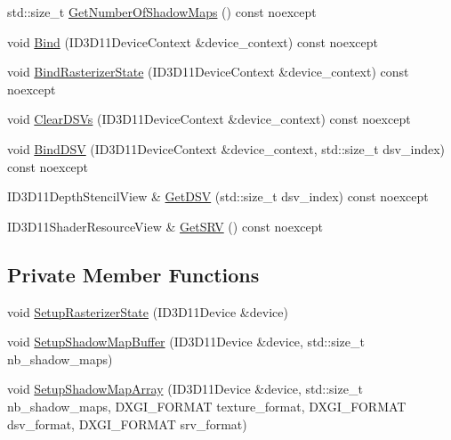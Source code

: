 \begin{DoxyCompactItemize}
\item 
std\+::size\+\_\+t \mbox{\hyperlink{classmage_1_1rendering_1_1_shadow_map_buffer_a7cdd2f44cbd75c40062da981771a91a6}{Get\+Number\+Of\+Shadow\+Maps}} () const noexcept
\item 
void \mbox{\hyperlink{classmage_1_1rendering_1_1_shadow_map_buffer_a59fccb2b8261a60c955f81e16d530cda}{Bind}} (I\+D3\+D11\+Device\+Context \&device\+\_\+context) const noexcept
\item 
void \mbox{\hyperlink{classmage_1_1rendering_1_1_shadow_map_buffer_a5216f8d02a3e92a8dcd34dcc6889563c}{Bind\+Rasterizer\+State}} (I\+D3\+D11\+Device\+Context \&device\+\_\+context) const noexcept
\item 
void \mbox{\hyperlink{classmage_1_1rendering_1_1_shadow_map_buffer_a1af9b2bbeaefb1367dbf6c66a2191bcc}{Clear\+D\+S\+Vs}} (I\+D3\+D11\+Device\+Context \&device\+\_\+context) const noexcept
\item 
void \mbox{\hyperlink{classmage_1_1rendering_1_1_shadow_map_buffer_ac0e077d4bfb672f1da69a7e2d8e62e04}{Bind\+D\+SV}} (I\+D3\+D11\+Device\+Context \&device\+\_\+context, std\+::size\+\_\+t dsv\+\_\+index) const noexcept
\item 
I\+D3\+D11\+Depth\+Stencil\+View \& \mbox{\hyperlink{classmage_1_1rendering_1_1_shadow_map_buffer_ac4904597828c7ffc823cf5686a4c6811}{Get\+D\+SV}} (std\+::size\+\_\+t dsv\+\_\+index) const noexcept
\item 
I\+D3\+D11\+Shader\+Resource\+View \& \mbox{\hyperlink{classmage_1_1rendering_1_1_shadow_map_buffer_adeb2ed077758818da87fd83dc26660e1}{Get\+S\+RV}} () const noexcept
\end{DoxyCompactItemize}
\subsection*{Private Member Functions}
\begin{DoxyCompactItemize}
\item 
void \mbox{\hyperlink{classmage_1_1rendering_1_1_shadow_map_buffer_a04622e03086e5a16783bad043b8754a8}{Setup\+Rasterizer\+State}} (I\+D3\+D11\+Device \&device)
\item 
void \mbox{\hyperlink{classmage_1_1rendering_1_1_shadow_map_buffer_a01fd620c3eb64dcaf9acc91580bedbb0}{Setup\+Shadow\+Map\+Buffer}} (I\+D3\+D11\+Device \&device, std\+::size\+\_\+t nb\+\_\+shadow\+\_\+maps)
\item 
void \mbox{\hyperlink{classmage_1_1rendering_1_1_shadow_map_buffer_a7a8e63fdcda8aafa6f241eb59bbdc6dd}{Setup\+Shadow\+Map\+Array}} (I\+D3\+D11\+Device \&device, std\+::size\+\_\+t nb\+\_\+shadow\+\_\+maps, D\+X\+G\+I\+\_\+\+F\+O\+R\+M\+AT texture\+\_\+format, D\+X\+G\+I\+\_\+\+F\+O\+R\+M\+AT dsv\+\_\+format, D\+X\+G\+I\+\_\+\+F\+O\+R\+M\+AT srv\+\_\+format)
\end{DoxyCompactItemize}
